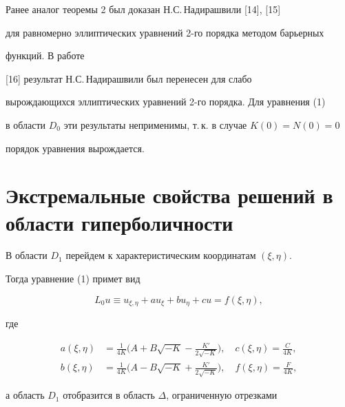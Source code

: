 \begin{note}


Ранее аналог теоремы 2 был доказан Н.С.\,Надирашвили [14], [15]


для равномерно эллиптических уравнений 2-го порядка методом барьерных


функций. В работе 


[16] результат Н.С.\,Надирашвили был перенесен для слабо 


вырождающихся эллиптических уравнений 2-го порядка. Для уравнения (1)


в области $D_0$ эти результаты неприменимы, т.\,к. в случае $K(0)=N(0)=0$ 


порядок уравнения вырождается.


\end{note} 





\section{Экстремальные свойства решений в области гиперболичности}





В области $D_1$ перейдем к характеристическим координатам $(\xi,\eta)$.


Тогда уравнение (1) примет вид 


\begin{equation}


L_0u\equiv u_{\xi,\eta}+au_{\xi}+bu_{\eta}+cu=f(\xi,\eta),


\end{equation}


где 


\begin{align*}


a(\xi,\eta)&=\frac {1}{4K}\bigg(A+B\sqrt {-K}-\frac {K'}{2\sqrt{-K}} 


\bigg),\quad c(\xi,\eta)=\frac {C}{4K},\\


%


b(\xi,\eta)&=\frac {1}{4K}\bigg (A-B\sqrt {-K}+\frac {K'}{2\sqrt{-K}}


\bigg),\quad f(\xi,\eta)=\frac {F}{4K},


\end{align*}


а область $D_1$ отобразится в область $\Delta$, ограниченную отрезками


